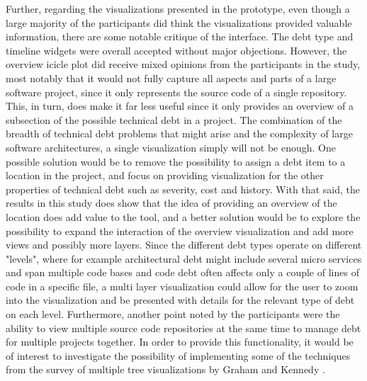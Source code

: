 Further, regarding the visualizations presented in the prototype, even though a large majority of the participants did think the visualizations provided valuable information, there are some notable critique of the interface.
The debt type and timeline widgets were overall accepted without major objections.
However, the overview icicle plot did receive mixed opinions from the participants in the study, most notably that it would not fully capture all aspects and parts of a large software project, since it only represents the source code of a single repository.
This, in turn, does make it far less useful since it only provides an overview of a subsection of the possible technical debt in a project.
The combination of the breadth of technical debt problems that might arise and the complexity of large software architectures, a single visualization simply will not be enough.
One possible solution would be to remove the possibility to assign a debt item to a location in the project, and focus on providing visualization for the other properties of technical debt such as severity, cost and history.
With that said, the results in this study does show that the idea of providing an overview of the location does add value to the tool, and a better solution would be to explore the possibility to expand the interaction of the overview visualization and add more views and possibly more layers.
Since the different debt types operate on different "levels", where for example architectural debt might include several micro services and span multiple code bases and code debt often affects only a couple of lines of code in a specific file, a multi layer visualization could allow for the user to zoom into the visualization and be presented with details for the relevant type of debt on each level.
Furthermore, another point noted by the participants were the ability to view multiple source code repositories at the same time to manage debt for multiple projects together.
In order to provide this functionality, it would be of interest to investigate the possibility of implementing some of the techniques from the survey of multiple tree visualizations by Graham and Kennedy \cite{graham_survey_2010}.


